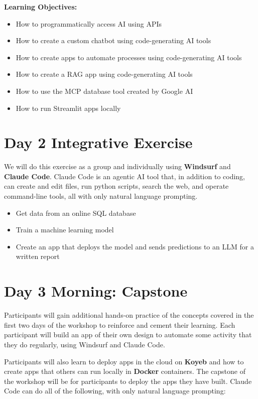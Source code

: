 \documentclass[11pt]{scrartcl}
\begin{document}
\noindent\textbf{Learning Objectives:}

\begin{itemize}
\item How to programmatically access AI using APIs
\item How to create a custom chatbot using code-generating AI tools
\item How to create apps to automate processes using code-generating AI tools
\item How to create a RAG app using code-generating AI tools
\item How to use the MCP database tool created by Google AI
\item How to run Streamlit apps locally
\end{itemize}

\section*{Day 2 Integrative Exercise}

We will do this exercise as a group and individually using \textbf{Windsurf} and \textbf{Claude Code}.  Claude Code is an agentic AI tool that, in addition to coding, can create and edit files, run python scripts, search the web, and operate command-line tools, all with only natural language prompting.

\begin{itemize}
\item Get data from an online SQL database
\item Train a machine learning model
\item Create an app that deploys the model and sends predictions to an LLM for a written report
\end{itemize}

\newpage
\section*{Day 3 Morning: Capstone}

Participants will gain additional hands-on practice of the concepts covered in the first two days of the workshop to reinforce and cement their learning. Each participant will build an app of their own design to automate some activity that they do regularly, using Windsurf and Claude Code.

Participants will also learn to deploy apps in the cloud on \textbf{Koyeb} and how to create apps that others can run locally in \textbf{Docker} containers. The capstone of the workshop will be for participants to deploy the apps they have built. Claude Code can do all of the following, with only natural language prompting:
\end{document}

